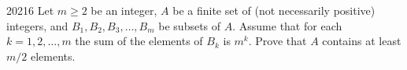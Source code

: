 \begin{problem}{2021}{6}
Let $m\geq2$ be an integer, $A$ be a finite set of (not necessarily positive) integers, and $B_1, B_2, B_3, \dots, B_m$ be subsets of $A$. Assume that for each $k=1, 2, \dots, m$ the sum of the elements of $B_k$ is $m^k$. Prove that $A$ contains at least $m/2$ elements.
\end{problem}
